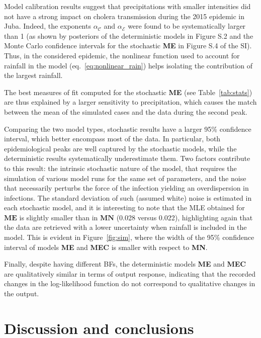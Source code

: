 Model calibration results suggest that precipitations with smaller intensities did not have a strong impact on cholera transmission during the 2015 epidemic in Juba. Indeed, the exponents $\alpha_{\mathcal{C}}$ and $\alpha_{\mathcal{E}}$ were found to be systematically larger than 1 (as shown by posteriors of the deterministic models in Figure S.2 and the Monte Carlo confidence intervals for the stochastic \textbf{ME} in Figure S.4 of the SI).  Thus, in the considered epidemic, the nonlinear function used to account for rainfall in the model (eq.~\ref{eq:nonlinear_rain}) helps isolating the contribution of the largest rainfall.

The best measures of fit computed for the stochastic \textbf{ME} (see Table~\ref{tab:stats}) are thus explained by a larger sensitivity to precipitation, which causes the match between the mean of the simulated cases and the data during the second peak.

Comparing the two model types, stochastic results have a larger 95\% confidence interval, which better encompass most of the data. In particular, both epidemiological peaks are well captured by the stochastic models, while the deterministic results systematically underestimate them. Two factors contribute to this result: the intrinsic stochastic nature of the model, that requires the simulation of various model runs for the same set of parameters, and the noise that necessarily perturbs the force of the infection yielding an overdispersion in infections. The standard deviation of such (assumed white) noise is estimated in each stochastic model, and it is interesting to note that the MLE obtained for $\mathbf{ME}$ is slightly smaller than in $\mathbf{MN}$ (0.028 versus 0.022), highlighting again that the data are retrieved with a lower uncertainty when rainfall is included in the model. This is evident in Figure~\ref{fig:sim}, where the width of the 95\% confidence interval of models \textbf{ME} and \textbf{MEC} is smaller with respect to \textbf{MN}.

Finally, despite having different BFs, the deterministic models \textbf{ME} and \textbf{MEC} are qualitatively similar in terms of output response, indicating that the recorded changes in the log-likelihood function do not correspond to qualitative changes in the output.

\section{Discussion and conclusions}
\label{sec:disc}


